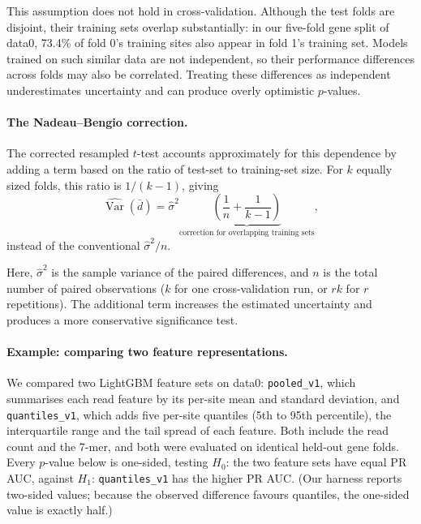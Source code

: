 \documentclass[11pt,a4paper]{article}
\begin{document}
This assumption does not hold in cross-validation. Although the test folds are disjoint, their training sets overlap substantially: in our five-fold gene split of data0, 73.4\% of fold 0's training sites also appear in fold 1's training set. Models trained on such similar data are not independent, so their performance differences across folds may also be correlated. Treating these differences as independent underestimates uncertainty and can produce overly optimistic $p$-values.

\paragraph{The Nadeau--Bengio correction.}
The corrected resampled $t$-test \citep{nadeau2003} accounts approximately for this dependence by adding a term based on the ratio of test-set to training-set size. For $k$ equally sized folds, this ratio is $1/(k-1)$, giving
\[
\widehat{\operatorname{Var}}(\bar d)
=
\hat{\sigma}^2
\underbrace{\left(
\frac{1}{n}+\frac{1}{k-1}
\right)}_{\text{correction for overlapping training sets}},
\]
instead of the conventional $\hat{\sigma}^2/n$.

Here, $\hat{\sigma}^2$ is the sample variance of the paired differences, and $n$ is the total number of paired observations ($k$ for one cross-validation run, or $rk$ for $r$ repetitions). The additional term increases the estimated uncertainty and produces a more conservative significance test.

\paragraph{Example: comparing two feature representations.}
We compared two LightGBM feature sets on data0: \texttt{pooled\_v1}, which summarises each read feature by its per-site mean and standard deviation, and \texttt{quantiles\_v1}, which adds five per-site quantiles (5th to 95th percentile), the interquartile range and the tail spread of each feature. Both include the read count and the 7-mer, and both were evaluated on identical held-out gene folds. Every $p$-value below is one-sided, testing $H_0$: the two feature sets have equal PR AUC, against $H_1$: \texttt{quantiles\_v1} has the higher PR AUC. (Our harness reports two-sided values; because the observed difference favours quantiles, the one-sided value is exactly half.)
\end{document}
